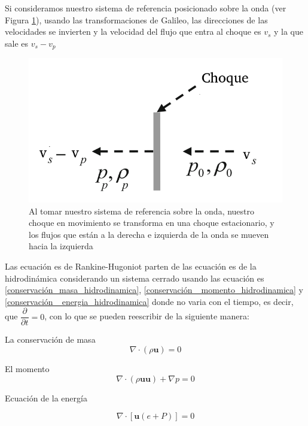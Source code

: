 \documentclass[12pt,a4paper]{book}
\begin{document}
Si consideramos nuestro sistema de referencia posicionado sobre la onda (ver Figura \ref{fig_stationary_shock}), usando las transformaciones de Galileo, las direcciones de las velocidades
se invierten y la velocidad del flujo que entra al choque es $v_s$ y la que sale es $v_s-v_p$

\begin{figure} 
  \centering
  \includegraphics[scale=0.7]{./Figuras/Teoria/stationary_shock.png}
  \caption{Al tomar nuestro sistema de referencia sobre la onda, nuestro choque en movimiento se transforma en una choque estacionario, y los
  flujos que están a la derecha e izquierda de la onda se mueven hacia la izquierda } \label{fig_stationary_shock}
\end{figure}

Las ecuación  es de Rankine-Hugoniot parten de las ecuación  es de la hidrodinámica considerando un sistema cerrado usando las ecuación  es \ref{conservación_masa_hidrodinamica}, \ref{conservación  _momento_hidrodinamica} y \ref{conservación  _energia_hidrodinamica} donde no varia con el tiempo, es decir, que $\dfrac{\partial}{\partial t}=0$, con lo que se pueden reescribir de la siguiente manera:


La conservación de masa
\begin{equation}
  \nabla \cdot \left( \rho \mathbf{u} \right)=0
\end{equation}

El momento
\begin{equation}
  \nabla \cdot \left( \rho \mathbf{u u} \right) + \nabla p = 0
\end{equation}

Ecuación de la energía

\begin{equation}
 \nabla \cdot \left[ \mathbf{u} \left( e+P \right) \right] = 0
\end{equation}
\end{document}
